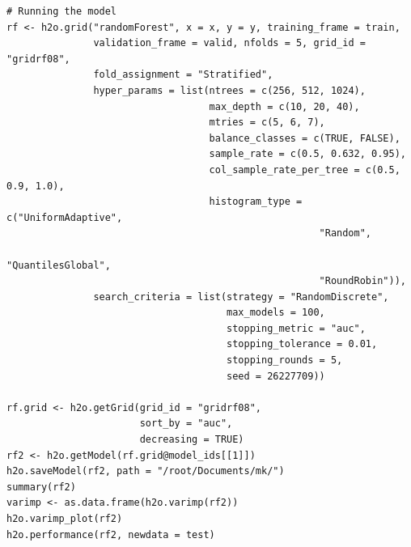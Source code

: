 \begin{verbatim}
# Running the model
rf <- h2o.grid("randomForest", x = x, y = y, training_frame = train, 
               validation_frame = valid, nfolds = 5, grid_id = "gridrf08",
               fold_assignment = "Stratified",
               hyper_params = list(ntrees = c(256, 512, 1024),
                                   max_depth = c(10, 20, 40),
                                   mtries = c(5, 6, 7),
                                   balance_classes = c(TRUE, FALSE),
                                   sample_rate = c(0.5, 0.632, 0.95),
                                   col_sample_rate_per_tree = c(0.5, 0.9, 1.0),
                                   histogram_type = c("UniformAdaptive",
                                                      "Random",
                                                      "QuantilesGlobal",
                                                      "RoundRobin")),
               search_criteria = list(strategy = "RandomDiscrete", 
                                      max_models = 100, 
                                      stopping_metric = "auc", 
                                      stopping_tolerance = 0.01, 
                                      stopping_rounds = 5, 
                                      seed = 26227709)) 

rf.grid <- h2o.getGrid(grid_id = "gridrf08",
                       sort_by = "auc",
                       decreasing = TRUE)
rf2 <- h2o.getModel(rf.grid@model_ids[[1]])
h2o.saveModel(rf2, path = "/root/Documents/mk/")
summary(rf2)
varimp <- as.data.frame(h2o.varimp(rf2))
h2o.varimp_plot(rf2)
h2o.performance(rf2, newdata = test)
     
\end{verbatim}


\doublespacing
\normalsize